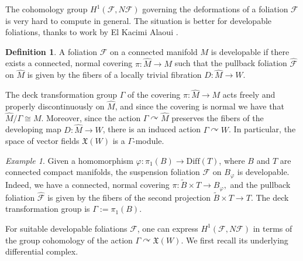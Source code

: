 \documentclass[11pt, letterpaper, oneside,reqno]{amsart}
\theoremstyle{plain}
\theoremstyle{underline}
\theoremstyle{definition}
\newtheorem{defi}[thm]{Definition}
\theoremstyle{remark}
\newtheorem{ex}[thm]{Example}
\begin{document}
	The cohomology group $H^{1}(\mathcal{F},N\mathcal{F})$ governing the deformations of a foliation $\mathcal{F}$ is  very hard to compute in general. The situation is better for developable foliations, thanks to work by El Kacimi Alaoui \cite{Kacimi}.
	
	\begin{defi}
		A foliation $\mathcal{F}$ on a connected manifold $M$ is developable if there exists a connected, normal covering $\pi:\widehat{M}\rightarrow M$ such that the pullback foliation $\widehat{\mathcal{F}}$ on $\widehat{M}$ is given by the fibers of a locally trivial fibration $D:\widehat{M}\rightarrow W$. 
	\end{defi}
	
	The deck transformation group $\Gamma$ of the covering $\pi:\widehat{M}\rightarrow M$ acts freely and properly discontinuously on $\widehat{M}$, and since the covering is normal we have that $\widehat{M}/\Gamma\cong M$. Moreover, since the action $\Gamma\curvearrowright\widehat{M}$ preserves the fibers of the developing map $D:\widehat{M}\rightarrow W$, there is an induced action $\Gamma\curvearrowright W$. In particular, the space of vector fields $\mathfrak{X}(W)$ is a $\Gamma$-module.
	
	\begin{ex}
		Given a homomorphism $\varphi:\pi_1(B)\rightarrow\text{Diff}(T)$, where $B$ and $T$ are connected compact manifolds, the suspension foliation $\mathcal{F}$ on $B_{\varphi}$ is developable. Indeed, we have a connected, normal covering 
		$
		\pi:\widetilde{B}\times T\rightarrow B_{\varphi},
		$
		and the pullback foliation $\widehat{\mathcal{F}}$ is given by the fibers of the second projection $\widetilde{B}\times T\rightarrow T$. The deck transformation group is $\Gamma:=\pi_1(B)$.
	\end{ex}
	
	For suitable developable foliations $\mathcal{F}$, one can express $H^{1}(\mathcal{F},N\mathcal{F})$ in terms of the group cohomology of the action $\Gamma\curvearrowright\mathfrak{X}(W)$. We first recall its underlying differential complex.
	
\end{document}
